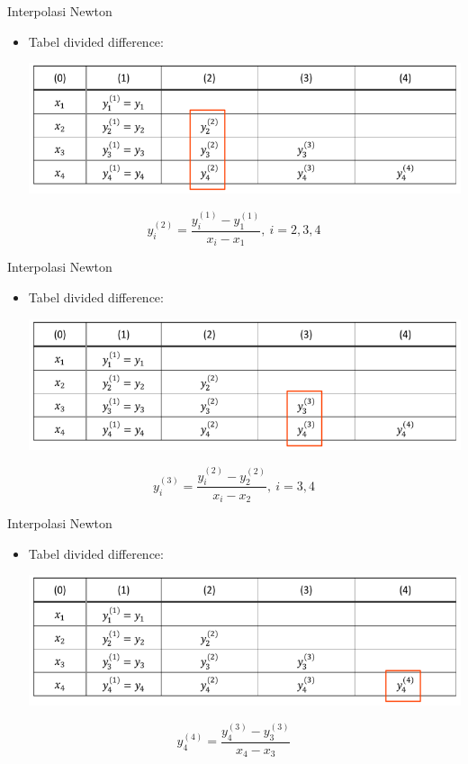 \documentclass[pdflatex,compress,mathserif]{beamer}
\begin{document}
\begin{frame}{Interpolasi Newton}
	\begin{itemize}
		\item Tabel divided difference:
		\begin{center}
			\includegraphics[width=\linewidth]{img/img04a}
		\end{center}
		\vfill
	\end{itemize}
		$$ y_i^{(2)} = \frac{y_i^{(1)} - y_1^{(1)}}{x_i - x_1},~i=2,3,4$$
\end{frame}

\begin{frame}{Interpolasi Newton}
	\begin{itemize}
		\item Tabel divided difference:
		\begin{center}
			\includegraphics[width=\linewidth]{img/img04b}
		\end{center}
		\vfill
	\end{itemize}
	$$ y_i^{(3)} = \frac{y_i^{(2)} - y_2^{(2)}}{x_i - x_2},~i=3,4$$
\end{frame}

\begin{frame}{Interpolasi Newton}
	\begin{itemize}
		\item Tabel divided difference:
		\begin{center}
			\includegraphics[width=\linewidth]{img/img04c}
		\end{center}
		\vfill
	\end{itemize}
	$$ y_4^{(4)} = \frac{y_4^{(3)} - y_3^{(3)}}{x_4 - x_3}$$
\end{frame}
\end{document}
